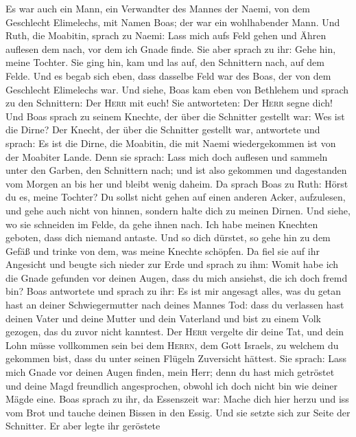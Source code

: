  Es war auch ein Mann, ein Verwandter des Mannes der
Naemi, von dem Geschlecht Elimelechs, mit Namen Boas; der war ein
wohlhabender Mann.  Und Ruth, die Moabitin, sprach zu
Naemi: Lass mich aufs Feld gehen und Ähren auflesen dem nach, vor dem
ich Gnade finde. Sie aber sprach zu ihr: Gehe hin, meine Tochter.
 Sie ging hin, kam und las auf, den Schnittern nach, auf
dem Felde. Und es begab sich eben, dass dasselbe Feld war des Boas, der
von dem Geschlecht Elimelechs war.  Und siehe, Boas kam
eben von Bethlehem und sprach zu den Schnittern: Der \textsc{Herr} mit
euch! Sie antworteten: Der \textsc{Herr} segne dich!  Und
Boas sprach zu seinem Knechte, der über die Schnitter gestellt war: Wes
ist die Dirne?  Der Knecht, der über die Schnitter
gestellt war, antwortete und sprach: Es ist die Dirne, die Moabitin, die
mit Naemi wiedergekommen ist von der Moabiter Lande.  Denn
sie sprach: Lass mich doch auflesen und sammeln unter den Garben, den
Schnittern nach; und ist also gekommen und dagestanden vom Morgen an bis
her und bleibt wenig daheim.  Da sprach Boas zu Ruth:
Hörst du es, meine Tochter? Du sollst nicht gehen auf einen anderen
Acker, aufzulesen, und gehe auch nicht von hinnen, sondern halte dich zu
meinen Dirnen.  Und siehe, wo sie schneiden im Felde, da
gehe ihnen nach. Ich habe meinen Knechten geboten, dass dich niemand
antaste. Und so dich dürstet, so gehe hin zu dem Gefäß und trinke von
dem, was meine Knechte schöpfen.  Da fiel sie auf ihr
Angesicht und beugte sich nieder zur Erde und sprach zu ihm: Womit habe
ich die Gnade gefunden vor deinen Augen, dass du mich ansiehst, die ich
doch fremd bin?  Boas antwortete und sprach zu ihr: Es
ist mir angesagt alles, was du getan hast an deiner Schwiegermutter nach
deines Mannes Tod: dass du verlassen hast deinen Vater und deine Mutter
und dein Vaterland und bist zu einem Volk gezogen, das du zuvor nicht
kanntest.  Der \textsc{Herr} vergelte dir deine Tat, und
dein Lohn müsse vollkommen sein bei dem \textsc{Herrn}, dem Gott
Israels, zu welchem du gekommen bist, dass du unter seinen Flügeln
Zuversicht hättest.  Sie sprach: Lass mich Gnade vor
deinen Augen finden, mein Herr; denn du hast mich getröstet und deine
Magd freundlich angesprochen, obwohl ich doch nicht bin wie deiner Mägde
eine.  Boas sprach zu ihr, da Essenszeit war: Mache dich
hier herzu und iss vom Brot und tauche deinen Bissen in den Essig. Und
sie setzte sich zur Seite der Schnitter. Er aber legte ihr geröstete
